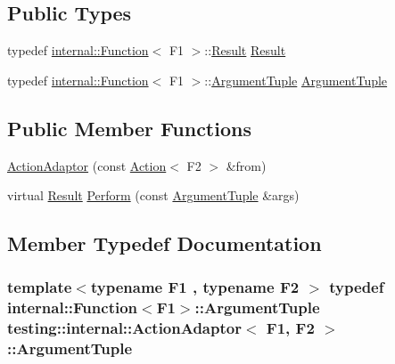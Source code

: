 \subsection*{Public Types}
\begin{DoxyCompactItemize}
\item 
typedef \hyperlink{structtesting_1_1internal_1_1_function}{internal\+::\+Function}$<$ F1 $>$\+::\hyperlink{classtesting_1_1internal_1_1_action_adaptor_afa8f7872b6db3d8f1545fd98b45b0b95}{Result} \hyperlink{classtesting_1_1internal_1_1_action_adaptor_afa8f7872b6db3d8f1545fd98b45b0b95}{Result}
\item 
typedef \hyperlink{structtesting_1_1internal_1_1_function}{internal\+::\+Function}$<$ F1 $>$\+::\hyperlink{classtesting_1_1internal_1_1_action_adaptor_a4f78fb73f97b72fea8a93b78a8ab5704}{Argument\+Tuple} \hyperlink{classtesting_1_1internal_1_1_action_adaptor_a4f78fb73f97b72fea8a93b78a8ab5704}{Argument\+Tuple}
\end{DoxyCompactItemize}
\subsection*{Public Member Functions}
\begin{DoxyCompactItemize}
\item 
\hyperlink{classtesting_1_1internal_1_1_action_adaptor_a24ba3330ef3cc365b956c50ec73e4177}{Action\+Adaptor} (const \hyperlink{classtesting_1_1_action}{Action}$<$ F2 $>$ \&from)
\item 
virtual \hyperlink{classtesting_1_1internal_1_1_action_adaptor_afa8f7872b6db3d8f1545fd98b45b0b95}{Result} \hyperlink{classtesting_1_1internal_1_1_action_adaptor_a8d8a47a31f068cf6e0c95b91605d5540}{Perform} (const \hyperlink{classtesting_1_1internal_1_1_action_adaptor_a4f78fb73f97b72fea8a93b78a8ab5704}{Argument\+Tuple} \&args)
\end{DoxyCompactItemize}


\subsection{Member Typedef Documentation}
\subsubsection[{\texorpdfstring{Argument\+Tuple}{ArgumentTuple}}]{\setlength{\rightskip}{0pt plus 5cm}template$<$typename F1 , typename F2 $>$ typedef {\bf internal\+::\+Function}$<$F1$>$\+::{\bf Argument\+Tuple} {\bf testing\+::internal\+::\+Action\+Adaptor}$<$ F1, F2 $>$\+::{\bf Argument\+Tuple}}\hypertarget{classtesting_1_1internal_1_1_action_adaptor_a4f78fb73f97b72fea8a93b78a8ab5704}{}\label{classtesting_1_1internal_1_1_action_adaptor_a4f78fb73f97b72fea8a93b78a8ab5704}
